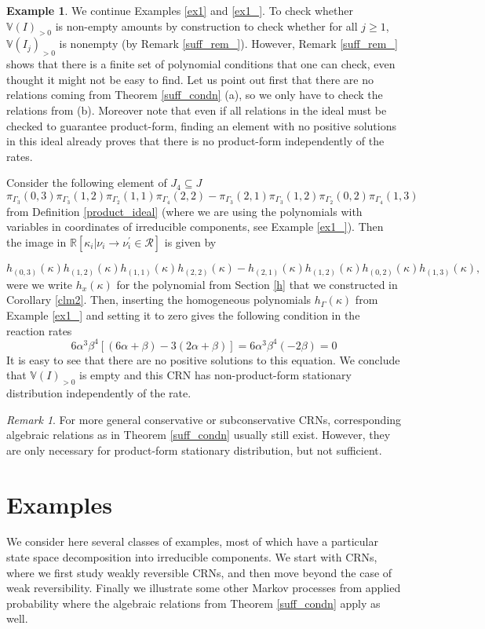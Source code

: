 \documentclass{amsart}
\theoremstyle{definition}
\newtheorem{example}[theorem]{Example}
\theoremstyle{remark}
\newtheorem{remark}[theorem]{Remark}
\theoremstyle{Conjecture/open problem}
\theoremstyle{assumption}
\theoremstyle{conjecture}
\def\a{\alpha}
\def\be{\beta}
\def\Ga{\Gamma}
\def\p{^{\prime}}
\def\k{\kappa}
\def\cR{\mathcal{R}}
\def\R{\mathbb{R}}
\numberwithin{equation}{section}
\begin{document}
\begin{example} We continue Examples \ref{ex1} and \ref{ex1_}. To check whether $\mathbb{V}(I)_{>0}$ is non-empty amounts by construction to check whether for all $j\geq 1$, $\mathbb{V}(I_j)_{>0}$ is nonempty (by Remark \ref{suff_rem_}).  However, Remark \ref{suff_rem_} shows that there is a finite set of polynomial conditions that one can check, even thought it might not be easy to find. Let us point out first that there are no relations coming from Theorem \ref{suff_condn} (a), so we only have to check the relations from (b). Moreover note that even if all relations in the ideal must be checked to guarantee product-form, finding an element with no positive solutions in this ideal already proves that there is no product-form independently of the rates.

 Consider the following element of $J_4\subseteq J$
 $$
 \pi_{\Ga_3}(0,3)\pi_{\Ga_3}(1,2)\pi_{\Ga_2}(1,1)\pi_{\Ga_4}(2,2)-\pi_{\Ga_3}(2,1)\pi_{\Ga_3}(1,2)\pi_{\Ga_2}(0,2)\pi_{\Ga_4}(1,3)
 $$
  from Definition \ref{product_ideal} (where we are using the polynomials with variables in coordinates of irreducible components, see Example \ref{ex1_}). Then the image in $\R[\k_i|\nu_i\to \nu_i\p\in\cR ]$ is given by

  $$h_{(0,3)}^{}(\k)h_{(1,2)}^{}(\k)h_{(1,1)}^{}(\k)h_{(2,2)}^{}(\k)-h_{(2,1)}^{}(\k)h_{(1,2)}^{}(\k)h_{(0,2)}^{}(\k)h_{(1,3)}^{}(\k)\mbox{,}$$  
were we write $h_{x}^{}(\k)$ for the polynomial 
from Section \ref{h} that we constructed in Corollary \ref{clm2}. Then, inserting the homogeneous polynomials $h_\Ga(\k)$ from Example \ref{ex1_} and setting it to zero gives the following condition in the reaction rates $$6\a^3\be^4[(6\a+\be)-3(2\a+\be)]=6\a^3\be^4(-2\be)=0$$ It is easy to see that there are no positive solutions to this equation. We conclude that $\mathbb{V}(I)_{>0}$ is empty and this CRN has non-product-form stationary distribution independently of the rate. 
\end{example}


 \begin{remark}
For more general conservative or subconservative CRNs, corresponding algebraic relations as in Theorem \ref{suff_condn} usually still exist. However, they are only necessary for product-form stationary distribution, but not sufficient.
 \end{remark}
 


\section{Examples}\label{exa}
We consider here several classes of examples, most of which have a particular state space decomposition into irreducible components. We start with CRNs, where we first study weakly reversible CRNs, and then move beyond the case of weak reversibility. Finally we illustrate some other Markov processes from applied probability where the algebraic relations from Theorem \ref{suff_condn} apply as well.
\end{document}
